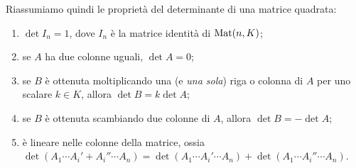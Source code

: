 Riassumiamo quindi le proprietà del determinante di una matrice quadrata:
\begin{enumerate}
	\item $\det I_n=1$, dove $I_n$ è la matrice identità di $\operatorname{Mat}(n,K)$;
	\item se $A$ ha due colonne uguali, $\det A=0$;
	\item se $B$ è ottenuta moltiplicando una (e \emph{una sola}) riga o colonna di $A$ per uno scalare $k\in K$, allora $\det B=k\det A$;
	\item se $B$ è ottenuta scambiando due colonne di $A$, allora $\det B=-\det A$;
	\item è lineare nelle colonne della matrice, ossia $\det(A_1\cdots A_i'+A_i''\cdots A_n)=\det(A_1\cdots A_i'\cdots A_n)+\det(A_1\cdots A_i''\cdots A_n)$.
\end{enumerate}

